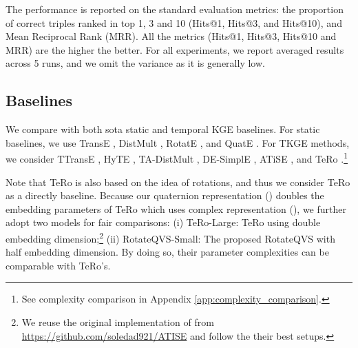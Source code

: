 \documentclass[11pt]{article}
\begin{document}
The performance is reported on the standard evaluation metrics: the proportion of correct triples ranked in top 1, 3 and 10 (Hits@1, Hits@3, and Hits@10), and Mean Reciprocal Rank (MRR).
All the metrics (Hits@1, Hits@3, Hits@10 and MRR) are the higher the better.
For all experiments, we report averaged results across 5 runs, and we omit the variance as it is generally low.



\subsection{Baselines}
\label{sec:Baselines}
We compare with both sota static and temporal KGE baselines.
For static baselines, we use TransE \cite{bordes2013translating}, DistMult \cite{Yang2015EmbeddingEA}, RotatE \cite{SunDNT19}, and QuatE \cite{zhang2019quaternion}.
For TKGE methods, we consider TTransE \cite{leblay2018deriving}, HyTE \cite{dasgupta2018hyte}, TA-DistMult \cite{garcia2018learning}, DE-SimplE \cite{goel2020diachronic}, ATiSE \cite{xu2019temporal}, and TeRo \cite{xu2020tero}.\footnote{See complexity comparison in Appendix \ref{app:complexity_comparison}.}


Note that TeRo \cite{xu2020tero} is also based on the idea of rotations, and thus we consider TeRo as a directly baseline.
Because our quaternion representation () doubles the embedding parameters of TeRo which uses complex representation (),  we further adopt two models for fair comparisons:
(i) TeRo-Large: TeRo using double embedding dimension;\footnote{We reuse the original implementation of \cite{xu2020tero} from \url{https://github.com/soledad921/ATISE} and follow the their best setups.}
(ii) RotateQVS-Small: The proposed RotateQVS with half embedding dimension.
By doing so, their parameter complexities can be comparable with TeRo's.
\end{document}
